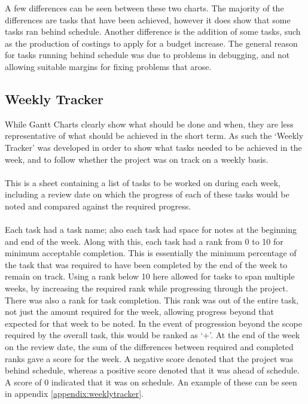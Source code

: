 \noindent
A few differences can be seen between these two charts.
The majority of the differences are tasks that have been achieved, however it does show that some tasks ran behind schedule.
Another difference is the addition of some tasks, such as the production of costings to apply for a budget increase.
The general reason for tasks running behind schedule was due to problems in debugging, and not allowing suitable margins for fixing problems that arose.

\subsection{Weekly Tracker}
While Gantt Charts clearly show what should be done and when, they are less representative of what should be achieved in the short term.
As such the `Weekly Tracker' was developed in order to show what tasks needed to be achieved in the week, and to follow whether the project was on track on a weekly basis.
\\
\\
This is a sheet containing a list of tasks to be worked on during each week, including a review date on which the progress of each of these tasks would be noted and compared against the required progress.
\\
\\
Each task had a task name; also each task had space for notes at the beginning and end of the week.
Along with this, each task had a rank from 0 to 10 for minimum acceptable completion.
This is essentially the minimum percentage of the task that was required to have been completed by the end of the week to remain on track.
Using a rank below 10 here allowed for tasks to span multiple weeks, by increasing the required rank while progressing through the project.
There was also a rank for task completion.
This rank was out of the entire task, not just the amount required for the week, allowing progress beyond that expected for that week to be noted.
In the event of progression beyond the scope required by the overall task, this would be ranked as `+'.
At the end of the week on the review date, the sum of the differences between required and completed ranks gave a score for the week.
A negative score denoted that the project was behind schedule, whereas a positive score denoted that it was ahead of schedule.
A score of 0 indicated that it was on schedule.
An example of these can be seen in appendix \ref{appendix:weeklytracker}.
\\
\\

